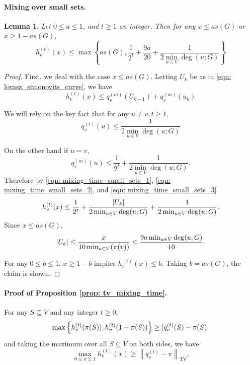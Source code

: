 \documentclass[11pt,twoside]{article}
\newtheorem{lemma}{Lemma}
\DeclarePairedDelimiter\abs{\lvert}{\rvert}
\newcommand{\set}[1]{\left\{#1\right\}}
\newcommand{\norm}[1]{\left\lVert#1\right\rVert}
\newcommand{\1}{\mathbf{1}}
\begin{document}
\paragraph{Mixing over small sets.}

\begin{lemma}
	\label{lem: mixing_time_small_sets}
	Let $0 \leq a \leq 1$, and $t \geq 1$ an integer. Then for any $x \leq as(G)$ or $x \geq 1 - as(G)$,
	\begin{equation*}
	h_v^{(t)}(x) \leq \max\set{as(G), \frac{1}{2^t} + \frac{9a}{20} + \frac{1}{2 \min_{u \in V}\deg(u;G)} }
	\end{equation*}
\end{lemma}
\begin{proof}
	First, we deal with the case $x \leq as(G)$. Letting $U_k$ be as in \eqref{eqn: lovasz_simonovits_curve}, we have
	\begin{equation}
	\label{eqn: mixing_time_small_sets_1}
	h_v^{(t)}(x) \leq q_v^{(m)}(U_{k - 1}) + q_v^{(m)}(u_k)
	\end{equation}
	
	We will rely on the key fact that for any $u \neq v, t \geq 1$,
	\begin{equation}
	\label{eqn: mixing_time_small_sets_2}
	q_v^{(t)}(u) \leq \frac{1}{2 \min_{u \in V}\deg(u;G)}
	\end{equation}
	
	On the other hand if $u = v$,
	\begin{equation}
	\label{eqn: mixing_time_small_sets_3}
	q_v^{(m)}(u) \leq \frac{1}{2^t} + \frac{1}{2\min_{u \in V}\deg(u;G)}.
	\end{equation}
	Therefore by \eqref{eqn: mixing_time_small_sets_1}, \eqref{eqn: mixing_time_small_sets_2}, and \eqref{eqn: mixing_time_small_sets_3}
	\begin{equation*}
	h_v^{(t)}(x) \leq \frac{1}{2^t} + \frac{\abs{U_k}}{2 \min_{u \in V}\deg(u;G)} + \frac{1}{2 \min_{u \in V}\deg(u;G)}.
	\end{equation*}
	Since $x \leq a s(G)$, 
	\begin{equation*}
	\abs{U_k} \leq \frac{x}{10 \min_{u \in V}(\pi(v))} \leq \frac{9a\min_{u \in V}\deg(u;G)}{10}.
	\end{equation*}
	
	For any $0 \leq b \leq 1$, $x \geq 1 - b$ implies $h_v^{(t)}(x) \leq b$. Taking $b = a s(G)$, the claim is shown.
\end{proof}

\paragraph{Proof of Proposition \ref{prop: tv_mixing_time}.}
For any $S \subseteq V$ and any integer $t \geq 0$,
\begin{equation*}
\max \set{h_v^{(t)}(\pi(S)), h_v^{(t)}(1 - \pi(S))} \geq \abs{q_v^{(t)}(S) - \pi(S)}
\end{equation*}
and taking the maximum over all $S \subseteq V$ on both sides, we have
\begin{equation*}
\max_{0 \leq x \leq 1} h_v^{(t)}(x) \geq \norm{q_v^{(t)} - \pi}_{\mathrm{TV}}.
\end{equation*}
\end{document}
